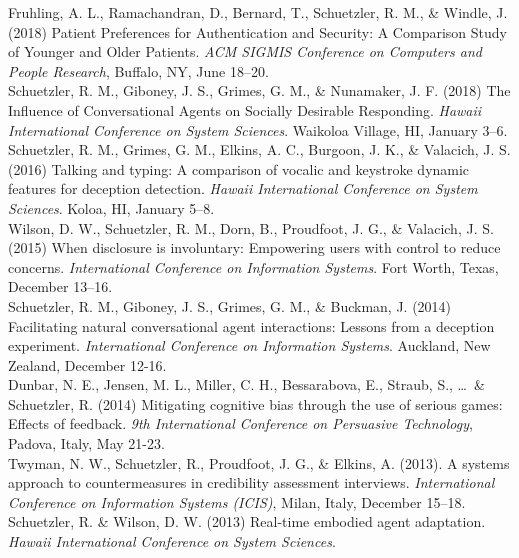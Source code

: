 \documentclass[10pt, letter]{article}
\newcommand{\years}[1]{\marginnote{\scriptsize #1}}
\begin{document}
\years{} Fruhling, A. L., Ramachandran, D., Bernard, T., Schuetzler, R. M., \& Windle, J. (2018)
Patient Preferences for Authentication and Security: A Comparison Study of Younger and Older Patients.
\emph{ACM SIGMIS Conference on Computers and People Research}, Buffalo, NY, June 18--20.\\

\years{} Schuetzler, R. M., Giboney, J. S., Grimes, G. M., \& Nunamaker, J.
F. (2018) The Influence of Conversational Agents on Socially Desirable
Responding. \emph{Hawaii International Conference on System Sciences}. Waikoloa Village, HI, January 3--6.\\

\years{2016}Schuetzler, R. M., Grimes, G. M., Elkins, A. C., Burgoon, J. K., \&
Valacich, J. S. (2016) Talking and typing: A comparison of vocalic and keystroke
dynamic features for deception detection. \emph{Hawaii International Conference
  on System Sciences}. Koloa, HI, January 5--8.\\

\years{2015}Wilson, D. W., Schuetzler, R. M., Dorn, B., Proudfoot, J. G., \&
Valacich, J. S. (2015) When disclosure is involuntary: Empowering users with
control to reduce concerns. \emph{International Conference on Information
  Systems}. Fort Worth, Texas, December 13--16.\\

\years{2014}Schuetzler, R. M., Giboney, J. S., Grimes, G. M., \& Buckman,
J. (2014) Facilitating natural conversational agent interactions: Lessons from a
deception experiment. \emph{International Conference on Information Systems}. Auckland, New Zealand, December 12-16.\\

Dunbar, N. E., Jensen, M. L., Miller, C. H., Bessarabova, E.,
Straub, S., \ldots~\& Schuetzler, R. (2014) Mitigating cognitive bias through
the use of serious games: Effects of feedback. \emph{9th International
  Conference on
  Persuasive Technology}, Padova, Italy, May 21-23.\\

\years{2013}Twyman, N. W., Schuetzler, R., Proudfoot, J. G., \& Elkins,
A. (2013). A systems approach to countermeasures in credibility assessment
interviews. \emph{International Conference on Information Systems (ICIS)},
Milan, Italy, December 15--18.\\

Schuetzler, R. \& Wilson, D. W. (2013) Real-time embodied agent
adaptation. \emph{Hawaii International Conference on System Sciences}.\\
\end{document}
